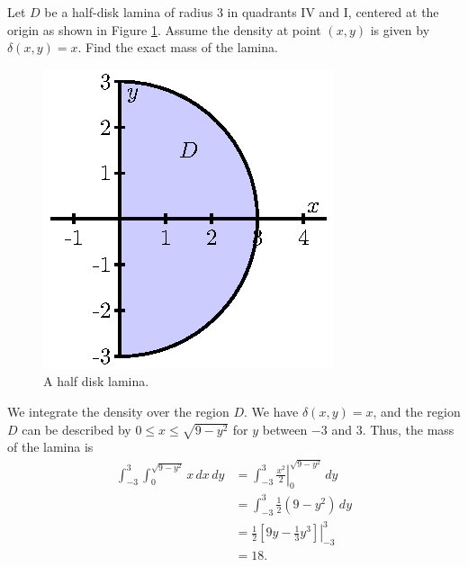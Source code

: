\begin{activity} \label{A:11.4.3} Let $D$ be a half-disk lamina of radius 3 in quadrants IV and I, centered at the origin as shown in Figure \ref{F:11.4.Mass_exercise}. Assume the density at point $(x,y)$ is given by $\delta(x,y) = x$. Find the exact mass of the lamina.

\begin{figure}[ht]
\begin{center}
  \includegraphics{figures/fig_11_4_half_circle.eps}
\end{center}
\caption{A half disk lamina.}
\label{F:11.4.Mass_exercise}
\end{figure}

\end{activity}
\begin{smallhint}

\end{smallhint}
\begin{bighint}

\end{bighint}
\begin{activitySolution}
We integrate the density over the region $D$. We have $\delta(x,y) = x$, and the region $D$ can be described by $0 \leq x \leq \sqrt{9-y^2}$ for $y$ between $-3$ and $3$. Thus, the mass of the lamina is
\begin{align*}
\int_{-3}^{3} \int_{0}^{\sqrt{9-y^2}} x \, dx \, dy &= \int_{-3}^{3} \left. \frac{x^2}{2} \right|_{0}^{\sqrt{9-y^2}} \, dy \\
	&= \int_{-3}^{3} \frac{1}{2}(9-y^2) \, dy \\
	&= \frac{1}{2} \left. \left[9y - \frac{1}{3}y^3\right]\right|_{-3}^{3} \\
	&= 18.
\end{align*}
\end{activitySolution}
\aftera
